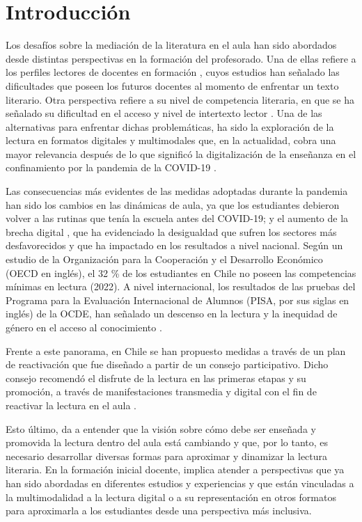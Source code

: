 \section{Introducción} \label{sec-introducción}

Los desafíos sobre la mediación de la literatura en el aula han sido
abordados desde distintas perspectivas en la formación del profesorado.
Una de ellas refiere a los perfiles lectores de docentes en formación
\cite{caride2018leer,colomer2013,granadopuig2014}, cuyos estudios han señalado las dificultades que poseen los
futuros docentes al momento de enfrentar un texto literario. Otra
perspectiva refiere a su nivel de competencia literaria, en que se ha
señalado su dificultad en el acceso y nivel de intertexto lector
\cite{contreras20515}. Una de las alternativas para enfrentar dichas
problemáticas, ha sido la exploración de la lectura en formatos
digitales y multimodales \cite{arbonés2015localización} que, en la
actualidad, cobra una mayor relevancia después de lo que significó la
digitalización de la enseñanza en el confinamiento por la pandemia de la
COVID-19 \cite{ciae_covid19._2020,miras_implications_2023,sanchez-cruzado_teacher_2021}.

Las consecuencias más evidentes de las medidas adoptadas durante la
pandemia han sido los cambios en las dinámicas de aula, ya que los
estudiantes debieron volver a las rutinas que tenía la escuela antes del
COVID-19; y el aumento de la brecha digital \cite{rivera_polo_brecha_2023}, que ha
evidenciado la desigualdad que sufren los sectores más desfavorecidos y
que ha impactado en los resultados a nivel nacional. Según un estudio de
la Organización para la Cooperación y el Desarrollo Económico (OECD en
inglés), el 32 \% de los estudiantes en Chile no poseen las competencias
mínimas en lectura (2022). A nivel internacional, los resultados de las
pruebas del Programa para la Evaluación Internacional de Alumnos (PISA,
por sus siglas en inglés) de la OCDE, han señalado un descenso en la
lectura y la inequidad de género en el acceso al conocimiento
\cite{schleicher_2023}.

Frente a este panorama, en Chile se han propuesto medidas a través de un
plan de reactivación que fue diseñado a partir de un consejo
participativo. Dicho consejo recomendó el disfrute de la lectura en las
primeras etapas y su promoción, a través de manifestaciones transmedia y
digital con el fin de reactivar la lectura en el aula \cite{consejopara}.

Esto último, da a entender que la visión sobre cómo debe ser enseñada y
promovida la lectura dentro del aula está cambiando y que, por lo tanto,
es necesario desarrollar diversas formas para aproximar y dinamizar la
lectura literaria. En la formación inicial docente, implica atender a
perspectivas que ya han sido abordadas en diferentes estudios y
experiencias y que están vinculadas a la multimodalidad \cite{reyesTorres_batallerCatalà_2019,berríos2022,farias2019,ow_forster_2012} a la lectura digital \cite{pallares2014,calvovalios2015,ballester2016} o a su representación
en otros formatos para aproximarla a los estudiantes desde una
perspectiva más inclusiva.

